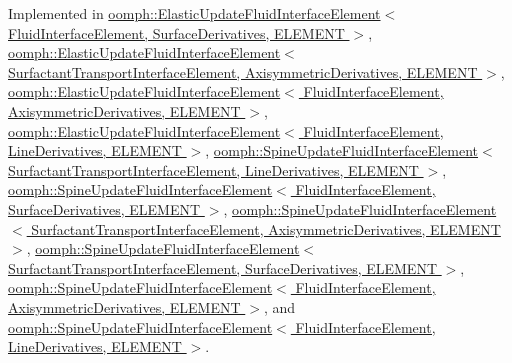 Implemented in \hyperlink{classoomph_1_1ElasticUpdateFluidInterfaceElement_ae82f486496a0647d905ab6ee857de0d0}{oomph\+::\+Elastic\+Update\+Fluid\+Interface\+Element$<$ Fluid\+Interface\+Element, Surface\+Derivatives, E\+L\+E\+M\+E\+N\+T $>$}, \hyperlink{classoomph_1_1ElasticUpdateFluidInterfaceElement_ae82f486496a0647d905ab6ee857de0d0}{oomph\+::\+Elastic\+Update\+Fluid\+Interface\+Element$<$ Surfactant\+Transport\+Interface\+Element, Axisymmetric\+Derivatives, E\+L\+E\+M\+E\+N\+T $>$}, \hyperlink{classoomph_1_1ElasticUpdateFluidInterfaceElement_ae82f486496a0647d905ab6ee857de0d0}{oomph\+::\+Elastic\+Update\+Fluid\+Interface\+Element$<$ Fluid\+Interface\+Element, Axisymmetric\+Derivatives, E\+L\+E\+M\+E\+N\+T $>$}, \hyperlink{classoomph_1_1ElasticUpdateFluidInterfaceElement_ae82f486496a0647d905ab6ee857de0d0}{oomph\+::\+Elastic\+Update\+Fluid\+Interface\+Element$<$ Fluid\+Interface\+Element, Line\+Derivatives, E\+L\+E\+M\+E\+N\+T $>$}, \hyperlink{classoomph_1_1SpineUpdateFluidInterfaceElement_aafe4d848b76bb62c987bdb9852c117bb}{oomph\+::\+Spine\+Update\+Fluid\+Interface\+Element$<$ Surfactant\+Transport\+Interface\+Element, Line\+Derivatives, E\+L\+E\+M\+E\+N\+T $>$}, \hyperlink{classoomph_1_1SpineUpdateFluidInterfaceElement_aafe4d848b76bb62c987bdb9852c117bb}{oomph\+::\+Spine\+Update\+Fluid\+Interface\+Element$<$ Fluid\+Interface\+Element, Surface\+Derivatives, E\+L\+E\+M\+E\+N\+T $>$}, \hyperlink{classoomph_1_1SpineUpdateFluidInterfaceElement_aafe4d848b76bb62c987bdb9852c117bb}{oomph\+::\+Spine\+Update\+Fluid\+Interface\+Element$<$ Surfactant\+Transport\+Interface\+Element, Axisymmetric\+Derivatives, E\+L\+E\+M\+E\+N\+T $>$}, \hyperlink{classoomph_1_1SpineUpdateFluidInterfaceElement_aafe4d848b76bb62c987bdb9852c117bb}{oomph\+::\+Spine\+Update\+Fluid\+Interface\+Element$<$ Surfactant\+Transport\+Interface\+Element, Surface\+Derivatives, E\+L\+E\+M\+E\+N\+T $>$}, \hyperlink{classoomph_1_1SpineUpdateFluidInterfaceElement_aafe4d848b76bb62c987bdb9852c117bb}{oomph\+::\+Spine\+Update\+Fluid\+Interface\+Element$<$ Fluid\+Interface\+Element, Axisymmetric\+Derivatives, E\+L\+E\+M\+E\+N\+T $>$}, and \hyperlink{classoomph_1_1SpineUpdateFluidInterfaceElement_aafe4d848b76bb62c987bdb9852c117bb}{oomph\+::\+Spine\+Update\+Fluid\+Interface\+Element$<$ Fluid\+Interface\+Element, Line\+Derivatives, E\+L\+E\+M\+E\+N\+T $>$}.

\mbox{\label{classoomph_1_1FluidInterfaceElement_a8f807a6456da7785b12e45a4c17fb969}} 
